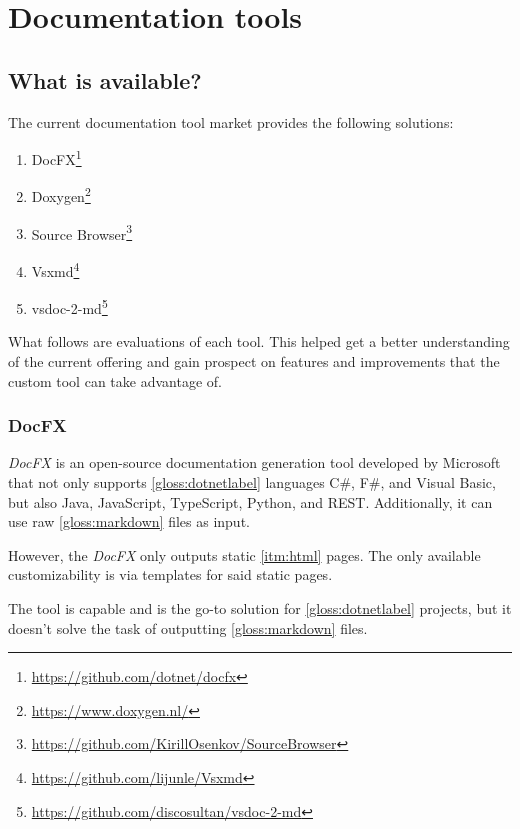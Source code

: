 \chapter{Documentation tools}
\section{What is available?} \label{sec:whatisavailable}
The current documentation tool market provides the following solutions:

\begin{enumerate}
    \item DocFX\footnote{\href{https://github.com/dotnet/docfx}{https://github.com/dotnet/docfx}}
    \item Doxygen\footnote{\href{https://www.doxygen.nl/}{https://www.doxygen.nl/}}
    \item Source Browser\footnote{\href{https://github.com/KirillOsenkov/SourceBrowser}{https://github.com/KirillOsenkov/SourceBrowser}}
    \item Vsxmd\footnote{\href{https://github.com/lijunle/Vsxmd}{https://github.com/lijunle/Vsxmd}}
    \item vsdoc-2-md\footnote{\href{https://github.com/discosultan/vsdoc-2-md}{https://github.com/discosultan/vsdoc-2-md}}
\end{enumerate}

What follows are evaluations of each tool. This helped get a better understanding of the current offering and gain prospect on features and improvements that the custom tool can take advantage of.

\subsection{DocFX} \label{ssec:docfx}

\textit{DocFX} is an open-source documentation generation tool developed by Microsoft that not only supports \ref{gloss:dotnetlabel} languages C\#, F\#, and Visual Basic, but also Java, JavaScript, TypeScript, Python, and REST. Additionally, it can use raw \ref{gloss:markdown} files as input.

However, the \textit{DocFX} only outputs static \ref{itm:html} pages. The only available customizability is via templates for said static pages.

The tool is capable and is the go-to solution for \ref{gloss:dotnetlabel} projects, but it doesn't solve the task of outputting \ref{gloss:markdown} files.

